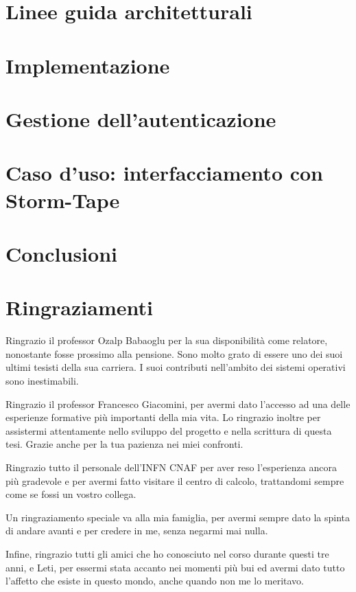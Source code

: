 \documentclass[12pt,a4paper,openright,twoside]{report}
\begin{document}
\chapter{Linee guida architetturali}
\lhead[\fancyplain{}{\bfseries\thepage}]{\fancyplain{}{\bfseries\rightmark}}


\chapter{Implementazione}
\lhead[\fancyplain{}{\bfseries\thepage}]{\fancyplain{}{\bfseries\rightmark}}


\chapter{Gestione dell'autenticazione}
\lhead[\fancyplain{}{\bfseries\thepage}]{\fancyplain{}{\bfseries\rightmark}}


\chapter{Caso d'uso: interfacciamento con Storm-Tape}
\lhead[\fancyplain{}{\bfseries\thepage}]{\fancyplain{}{\bfseries\rightmark}}


\chapter{Conclusioni}
\lhead[\fancyplain{}{\bfseries\thepage}]{\fancyplain{}{\bfseries\rightmark}}




\chapter*{Ringraziamenti}
Ringrazio il professor Ozalp Babaoglu per la sua disponibilità come relatore, nonostante fosse prossimo alla pensione. 
Sono molto grato di essere uno dei suoi ultimi tesisti della sua carriera. I suoi contributi nell'ambito dei sistemi operativi sono inestimabili.  


Ringrazio il professor Francesco Giacomini, per avermi dato l'accesso ad una delle esperienze formative più importanti della mia vita. Lo ringrazio 
inoltre per assistermi attentamente nello sviluppo del progetto e nella scrittura di questa tesi. Grazie anche per la tua pazienza nei miei confronti.  

Ringrazio tutto il personale dell'INFN CNAF per aver reso l'esperienza ancora più gradevole e per avermi fatto visitare il centro di calcolo, trattandomi sempre come se fossi un vostro collega.  

Un ringraziamento speciale va alla mia famiglia, per avermi sempre dato la spinta di andare avanti e per credere in me, senza negarmi mai nulla. 

Infine, ringrazio tutti gli amici che ho conosciuto nel corso durante questi tre anni, e Leti, per essermi stata accanto nei momenti più bui ed avermi dato tutto l'affetto che esiste in questo mondo, anche quando non me lo meritavo.  
\end{document}
